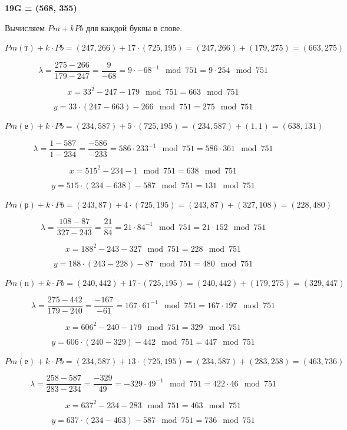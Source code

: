 \textbf{19G = (568, 355)}

Вычисляем $Pm+kPb$ для каждой буквы в слове.

\textbf{$Pm(\text{т})+k \cdot Pb = (247, 266) + 17 \cdot (725, 195) = (247, 266) + (179, 275) = (663, 275)$}

\[
\lambda = \frac{275-266}{179-247} = \frac{9}{-68} = 9 \cdot -68^{-1}\mod{751} = 9 \cdot 254\mod{751}
\]


\[
x = 33^2 - 247 - 179 \mod{751} = 663\mod{751}
\]


\[
y = 33 \cdot (247 - 663) - 266\mod{751} = 275\mod{751}
\]

\textbf{$Pm(\text{е})+k \cdot Pb = (234, 587) + 5 \cdot (725, 195) = (234, 587) + (1, 1) = (638, 131)$}

\[
\lambda = \frac{1-587}{1-234} = \frac{-586}{-233} = 586 \cdot 233^{-1}\mod{751} = 586 \cdot 361\mod{751}
\]


\[
x = 515^2 - 234 - 1 \mod{751} = 638\mod{751}
\]


\[
y = 515 \cdot (234 - 638) - 587\mod{751} = 131\mod{751}
\]

\textbf{$Pm(\text{р})+k \cdot Pb = (243, 87) + 4 \cdot (725, 195) = (243, 87) + (327, 108) = (228, 480)$}

\[
\lambda = \frac{108-87}{327-243} = \frac{21}{84} = 21 \cdot 84^{-1}\mod{751} = 21 \cdot 152\mod{751}
\]


\[
x = 188^2 - 243 - 327 \mod{751} = 228\mod{751}
\]


\[
y = 188 \cdot (243 - 228) - 87\mod{751} = 480\mod{751}
\]

\textbf{$Pm(\text{п})+k \cdot Pb = (240, 442) + 17 \cdot (725, 195) = (240, 442) + (179, 275) = (329, 447)$}

\[
\lambda = \frac{275-442}{179-240} = \frac{-167}{-61} = 167 \cdot 61^{-1}\mod{751} = 167 \cdot 197\mod{751}
\]


\[
x = 606^2 - 240 - 179 \mod{751} = 329\mod{751}
\]


\[
y = 606 \cdot (240 - 329) - 442\mod{751} = 447\mod{751}
\]

\textbf{$Pm(\text{е})+k \cdot Pb = (234, 587) + 13 \cdot (725, 195) = (234, 587) + (283, 258) = (463, 736)$}

\[
\lambda = \frac{258-587}{283-234} = \frac{-329}{49} = -329 \cdot 49^{-1}\mod{751} = 422 \cdot 46\mod{751}
\]


\[
x = 637^2 - 234 - 283 \mod{751} = 463\mod{751}
\]


\[
y = 637 \cdot (234 - 463) - 587\mod{751} = 736\mod{751}
\]


